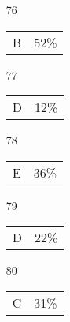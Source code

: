 \documentclass[12pt]{article}
\begin{document}
\begin{multicols}{5}
\begin{enumerate}
\item[]
\item[76] \begin{tabular}{cc} B & 52\%\end{tabular}
\item[77] \begin{tabular}{cc} D & 12\%\end{tabular}
\item[78] \begin{tabular}{cc} E & 36\%\end{tabular}
\item[79] \begin{tabular}{cc} D & 22\%\end{tabular}
\item[80] \begin{tabular}{cc} C & 31\%\end{tabular}

\item[]


\end{enumerate}
\end{multicols}
\end{document}
